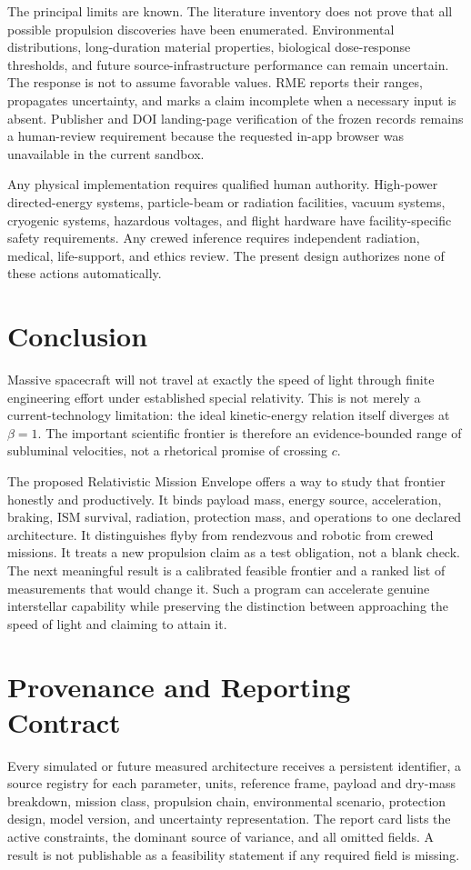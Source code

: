 \documentclass[conference]{../../../../Conference-LaTeX-template_10-17-19/IEEEtran}
\begin{document}
The principal limits are known. The literature inventory does not prove that all possible propulsion discoveries have been enumerated. Environmental distributions, long-duration material properties, biological dose-response thresholds, and future source-infrastructure performance can remain uncertain. The response is not to assume favorable values. RME reports their ranges, propagates uncertainty, and marks a claim incomplete when a necessary input is absent. Publisher and DOI landing-page verification of the frozen records remains a human-review requirement because the requested in-app browser was unavailable in the current sandbox.

Any physical implementation requires qualified human authority. High-power directed-energy systems, particle-beam or radiation facilities, vacuum systems, cryogenic systems, hazardous voltages, and flight hardware have facility-specific safety requirements. Any crewed inference requires independent radiation, medical, life-support, and ethics review. The present design authorizes none of these actions automatically.

\section{Conclusion}
Massive spacecraft will not travel at exactly the speed of light through finite engineering effort under established special relativity. This is not merely a current-technology limitation: the ideal kinetic-energy relation itself diverges at $\beta=1$. The important scientific frontier is therefore an evidence-bounded range of subluminal velocities, not a rhetorical promise of crossing $c$.

The proposed Relativistic Mission Envelope offers a way to study that frontier honestly and productively. It binds payload mass, energy source, acceleration, braking, ISM survival, radiation, protection mass, and operations to one declared architecture. It distinguishes flyby from rendezvous and robotic from crewed missions. It treats a new propulsion claim as a test obligation, not a blank check. The next meaningful result is a calibrated feasible frontier and a ranked list of measurements that would change it. Such a program can accelerate genuine interstellar capability while preserving the distinction between approaching the speed of light and claiming to attain it.

\appendices
\section{Provenance and Reporting Contract}
Every simulated or future measured architecture receives a persistent identifier, a source registry for each parameter, units, reference frame, payload and dry-mass breakdown, mission class, propulsion chain, environmental scenario, protection design, model version, and uncertainty representation. The report card lists the active constraints, the dominant source of variance, and all omitted fields. A result is not publishable as a feasibility statement if any required field is missing.
\end{document}
